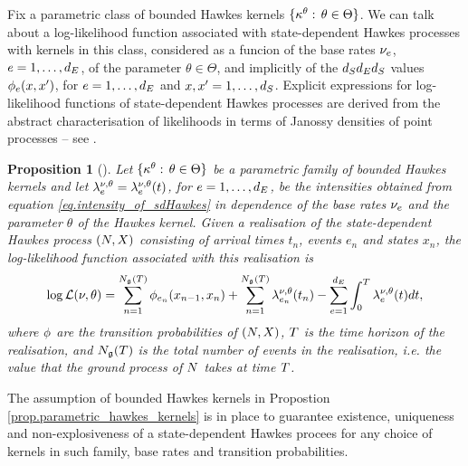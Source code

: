 \documentclass[10pt, article,table]{article}
\newtheorem{prop}[thm]{Proposition}
\begin{document}
Fix a parametric class of bounded Hawkes kernels $\lbrace\hawkesKernel^\theta : \, \theta \in \Theta \rbrace$. We can talk about a log-likelihood function associated with state-dependent Hawkes processes with kernels in this class, considered as a funcion of the base rates $\baseRate_e$, $e=1,\dots,\numEventTypes$, of the parameter $\theta \in \Theta$, and implicitly of the $\numStates\numEventTypes\numStates$ values $\transProb_{e}(x,\xone)$, for $e=1,\dots,\numEventTypes$ and $x,\xone=1,\dots,\numStates$. Explicit expressions for log-likelihood functions of state-dependent Hawkes processes are derived from the abstract characterisation of likelihoods in terms of Janossy densities of point processes -- see \citealp[Chapters 7 and 14]{DVJ08int}.
\begin{prop}[{\citealp[Theorem 3.1]{MP18sta}}]
 Let $\lbrace\hawkesKernel^\theta : \, \theta \in \Theta \rbrace$ be a parametric family of bounded Hawkes kernels and let $\intensity^{\baseRate,\theta}=\intensity^{\baseRate,\theta}(t)$, for $e=1,\dots, \numEventTypes$, be the intensities obtained from equation \eqref{eq.intensity_of_sdHawkes} in dependence of the base rates $\baseRate_e$ and the parameter $\theta$ of the Hawkes kernel.  Given a realisation of the state-dependent Hawkes process $(\multiCountingProc, \stateVariable)$ consisting of arrival times $t_n$, events $e_n$ and states $x_n$, the log-likelihood function associated with this realisation is 
 \begin{equation}\label{eq.loglikelihood_general}
  \log \likelihood (\nu,\theta) 
  =
  \sum_{n=1}^{\groundProc(\timeHorizon)} \transProb_{e_n}(x_{n-1},x_{n})
  +\sum_{n=1}^{\groundProc(\timeHorizon)} \intensity[e_{n}]^{\baseRate,\theta}(t_n)
  -\sum_{e=1}^{\numEventTypes} \int_{0}^{\timeHorizon} \intensity^{\baseRate,\theta}(t)dt, 
 \end{equation}
where $\transProb$ are the transition probabilities of $(\multiCountingProc, \stateVariable)$, $\timeHorizon$ is the time horizon of the realisation, and $\groundProc(\timeHorizon)$ is the total number of events in the realisation, i.e. the value that the ground process of  $\multiCountingProc$ takes at time $\timeHorizon$. 
\end{prop}
The assumption of bounded Hawkes kernels in Propostion \ref{prop.parametric_hawkes_kernels} is in place to guarantee existence, uniqueness and non-explosiveness of a state-dependent Hawkes procees for any choice of kernels in such family, base rates and transition probabilities.  
\end{document}
